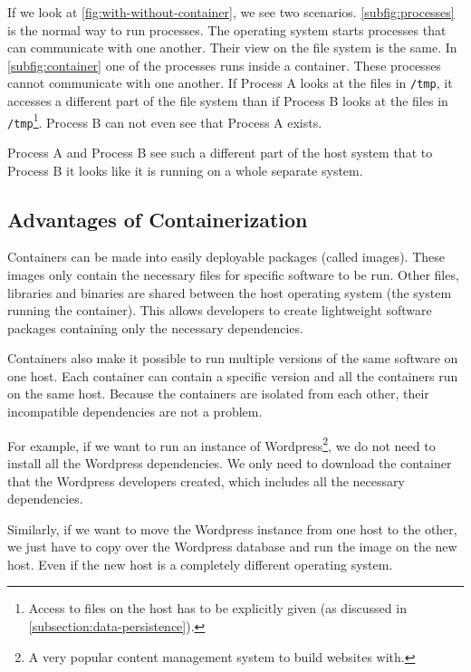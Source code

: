 If we look at \autoref{fig:with-without-container}, we see two scenarios. \autoref{subfig:processes} is the normal way to run processes. The operating system starts processes that can communicate with one another. Their view on the file system is the same.
In \autoref{subfig:container} one of the processes runs inside a container. These processes cannot communicate with one another. If Process A looks at the files in \lstinline{/tmp}, it accesses a different part of the file system than if Process B looks at the files in \lstinline{/tmp}\footnote{Access to files on the host has to be explicitly given (as discussed in \autoref{subsection:data-persistence}).}. Process B can not even see that Process A exists.

\medskip

Process A and Process B see such a different part of the host system that to Process B it looks like it is running on a whole separate system.

\subsection{Advantages of Containerization}

Containers can be made into easily deployable packages (called images). These images only contain the necessary files for specific software to be run. Other files, libraries and binaries are shared between the host operating system (the system running the container). This allows developers to create lightweight software packages containing only the necessary dependencies.

\medskip

Containers also make it possible to run multiple versions of the same software on one host. Each container can contain a specific version and all the containers run on the same host. Because the containers are isolated from each other, their incompatible dependencies are not a problem.

\medskip

For example, if we want to run an instance of Wordpress\footnote{A very popular content management system to build websites with.}, we do not need to install all the Wordpress dependencies. We only need to download the container that the Wordpress developers created, which includes all the necessary dependencies.

Similarly, if we want to move the Wordpress instance from one host to the other, we just have to copy over the Wordpress database and run the image on the new host. Even if the new host is a completely different operating system.


